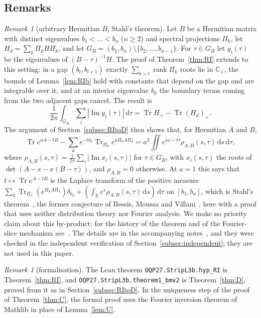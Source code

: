 \documentclass[11pt]{amsart}
\theoremstyle{definition}
\theoremstyle{remark}
\newtheorem{remark}[theorem]{Remark}
\numberwithin{equation}{section}
\newcommand{\R}{\mathbb{R}}
\newcommand{\C}{\mathbb{C}}
\newcommand{\Tr}{\operatorname{Tr}}
\renewcommand{\Im}{\operatorname{Im}}
\newcommand{\dd}{\,\mathrm{d}}
\begin{document}
\subsection{Remarks}

\begin{remark}[arbitrary Hermitian $B$; Stahl's theorem]\label{rem:RIgeneralB}
Let $B$ be a Hermitian matrix with distinct eigenvalues $b_1<\dots<b_n$ ($n\ge2$) and spectral projections $\Pi_k$, let
$H_d=\sum_k\Pi_kH\Pi_k$, and let $G_B=(b_1,b_n)\setminus\{b_2,\dots,b_{n-1}\}$. For $\tau\in G_B$ let $y_i(\tau)$ be the
eigenvalues of $(B-\tau)^{-1}H$. The proof of Theorem~\ref{thm:RI} extends to this setting: in a gap $(b_l,b_{l+1})$
exactly $\sum_{k>l}\operatorname{rank}\Pi_k$ roots lie in $\C_+$, the bounds of Lemma~\ref{lem:RIb} hold with constants that
depend on the gap and are integrable over it, and at an interior eigenvalue $b_k$ the boundary terms coming from the two
adjacent gaps cancel. The result is
\[
\frac1{2\pi}\int_{G_B}\sum_i|\Im y_i(\tau)|\dd\tau=\Tr H_+-\Tr(H_d)_+ .
\]
The argument of Section~\ref{subsec:RItoD} then shows that, for Hermitian $A$ and $B$,
\[
\Tr e^{aA-tB}-\sum_ke^{-tb_k}\Tr_{\Pi_k}e^{a\Pi_kA\Pi_k}=a^2\iint e^{as-t\tau}\rho_{A,B}(s,\tau)\dd s\dd\tau,
\]
where $\rho_{A,B}(s,\tau)=\frac1{2\pi}\sum_i|\Im x_i(s,\tau)|$ for $\tau\in G_B$, with $x_i(s,\tau)$ the roots of
$\det(A-s-x(B-\tau))$, and $\rho_{A,B}=0$ otherwise. At $a=1$ this says that $t\mapsto\Tr e^{A-tB}$ is the Laplace transform of
the positive measure $\sum_k\Tr_{\Pi_k}(e^{\Pi_kA\Pi_k})\delta_{b_k}+(\int_\R e^s\rho_{A,B}(s,\tau)\dd s)\dd\tau$ on $[b_1,b_n]$,
which is Stahl's theorem~\cite{Stahl}, the former conjecture of Bessis, Moussa and Villani~\cite{BMV}, here with a proof that
uses neither distribution theory nor Fourier analysis. We make no priority claim about this by-product; for the history of
the theorem and of the Fourier-slice mechanism see~\cite{Stahl,Eremenko,LS,He}. The details are in the accompanying
notes~\cite{repo-oqp27}, and they were checked in the independent verification of Section~\ref{subsec:independent}; they are
not used in this paper.
\end{remark}

\begin{remark}[formalisation]\label{rem:RIlean}
The Lean theorem \nolinkurl{OQP27.StripL3b.hyp_RI} is Theorem~\ref{thm:RI}, and \nolinkurl{OQP27.StripL3b.theorem1_bmv2}
is Theorem~\ref{thm:D}, proved from it as in Section~\ref{subsec:RItoD}. In the uniqueness step of the proof of
Theorem~\ref{thm:C}, the formal proof uses the Fourier inversion theorem of Mathlib in place of Lemma~\ref{lem:U}.
\end{remark}
\end{document}
